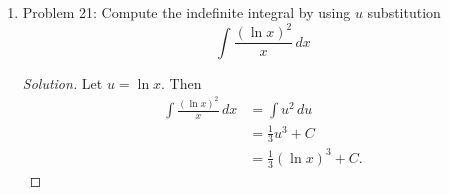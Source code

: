\documentclass{article}
\theoremstyle{plain}
\theoremstyle{definition}
\begin{document}
\begin{enumerate}
\begin{enumerate}
		            \begin{equation}
			            \int \cos^3\theta \sin \theta \,d\theta
		            \end{equation}
		            \begin{proof}[Solution]
			            Let $u = \cos \theta$.
			            Then
			            \begin{align}
				            \int \cos^3\theta \sin \theta \,d\theta & = -\int u^3\,du                 \\
				                                                    & = -\frac{1}{4}u^4 + C           \\
				                                                    & = -\frac{1}{4}\cos^4\theta + C.
			            \end{align}
		            \end{proof}
		      \item Problem 21: Compute the indefinite integral by using $u$ substitution
		            \begin{equation}
			            \int \frac{(\ln x)^2}{x}\,dx
		            \end{equation}
		            \begin{proof}[Solution]
			            Let $u = \ln x$.
			            Then
			            \begin{align}
				            \int \frac{(\ln x)^2}{x}\,dx & = \int u^2 \, du            \\
				                                         & = \frac{1}{3}u^3 + C        \\
				                                         & = \frac{1}{3}(\ln x)^3 + C.
			            \end{align}
		            \end{proof}
	      \end{enumerate}
\end{enumerate}
\end{document}
